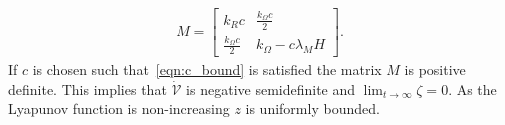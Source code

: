 \documentclass[letterpaper, 10 pt, conference]{ieeeconf}  %
\begin{document}
	\begin{gather}
		M = \begin{bmatrix}
			k_R c & \frac{k_\Omega c}{2} \\
			\frac{k_\Omega c}{2} & k_\Omega - c \lambda_M H
		\end{bmatrix} .
	\end{gather}
	If \( c \) is chosen such that~\cref{eqn:c_bound} is satisfied the matrix \( M \) is positive definite.
	This implies that $\dot{\mathcal{V}}$ is negative semidefinite and $\lim_{t\to\infty} \zeta=0$. 
	As the Lyapunov function is non-increasing $z$ is uniformly bounded. 
%	
%	

                                  


\end{document}

